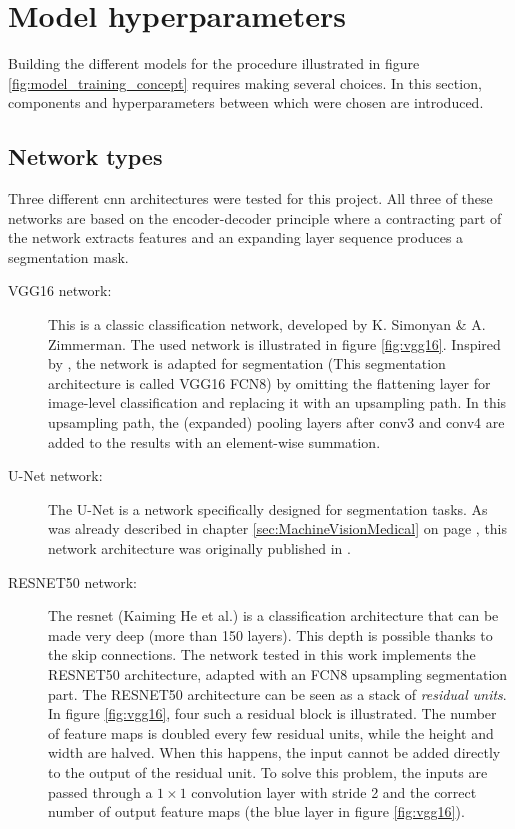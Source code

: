 \section{Model hyperparameters}

Building the different models for the procedure illustrated in figure \ref{fig:model_training_concept} requires making several choices.
In this section, components and hyperparameters between which were chosen are introduced.

\subsection{Network types\label{sec:network_types}}

Three different \acrlong{cnn} architectures were tested for this project.
All three of these networks are based on the encoder-decoder principle where a contracting part of the network extracts \Gls{features} and an expanding layer sequence produces a segmentation mask.

\begin{description}
    \item[VGG16 network: ] This is a classic classification network, developed by K. Simonyan \& A. Zimmerman. 
    The used network is illustrated in figure \ref{fig:vgg16}. 
    Inspired by \cite{Laradji2021}, the network is adapted for segmentation (This segmentation architecture is called VGG16 FCN8) by omitting the flattening layer for image-level classification and replacing it with an upsampling path. In this upsampling path, the (expanded) pooling layers after conv3 and conv4 are added to the results with an element-wise summation.
    \item[U-Net network: ] The U-Net is a network specifically designed for segmentation tasks. As was already described in chapter \ref{sec:MachineVisionMedical} on page \pageref{sec:MachineVisionMedical}, 
    this network architecture was originally published in \cite{Ronneberger2015}.
    \item[RESNET50 network:] The \Gls{resnet} (Kaiming He et al.) is a classification architecture that can be made very deep (more than 150 layers).
    This depth is possible thanks to the skip connections. The network tested in this work implements the RESNET50 architecture, adapted with an FCN8 upsampling segmentation part.
    The RESNET50 architecture can be seen as a stack of \textit{residual units}. In figure \ref{fig:vgg16}, four such a residual block is illustrated.
    The number of feature maps is doubled every few residual units, while the height and width are halved. When this happens, the input cannot be added directly to the output of the residual unit.
    To solve this problem, the inputs are passed through a $1\times 1$ convolution layer with stride 2 and the correct number of output feature maps (the blue layer in figure \ref{fig:vgg16}).
\end{description}

